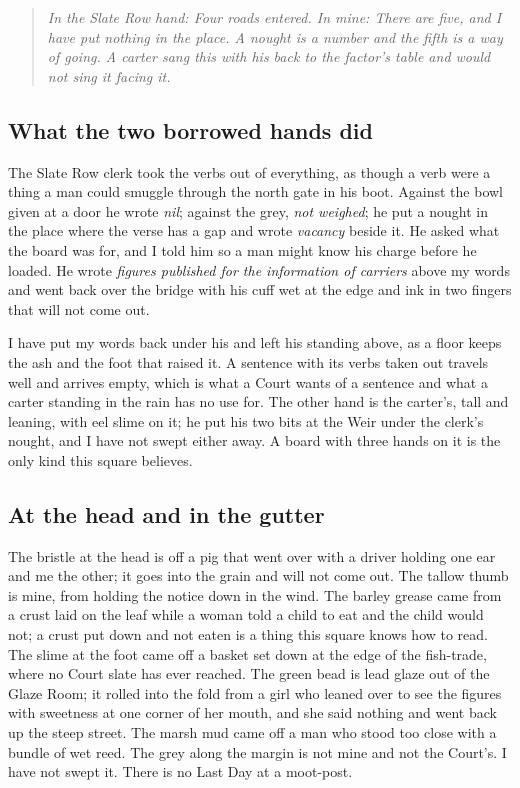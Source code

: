 \documentclass{design/chronicle}
\begin{document}
\begin{quote}\itshape \emph{In the Slate Row hand:} Four roads entered. \emph{In mine:} There are five, and I have put nothing in the place. A nought is a number and the fifth is a way of going. A carter sang this with his back to the factor’s table and would not sing it facing it.\end{quote}

\subsection*{What the two borrowed hands did}

The Slate Row clerk took the verbs out of everything, as though a verb were a thing a man could smuggle through the north gate in his boot. Against the bowl given at a door he wrote \emph{nil}; against the grey, \emph{not weighed}; he put a nought in the place where the verse has a gap and wrote \emph{vacancy} beside it. He asked what the board was for, and I told him so a man might know his charge before he loaded. He wrote \emph{figures published for the information of carriers} above my words and went back over the bridge with his cuff wet at the edge and ink in two fingers that will not come out.

I have put my words back under his and left his standing above, as a floor keeps the ash and the foot that raised it. A sentence with its verbs taken out travels well and arrives empty, which is what a Court wants of a sentence and what a carter standing in the rain has no use for. The other hand is the carter’s, tall and leaning, with eel slime on it; he put his two bits at the Weir under the clerk’s nought, and I have not swept either away. A board with three hands on it is the only kind this square believes.

\subsection*{At the head and in the gutter}

The bristle at the head is off a pig that went over with a driver holding one ear and me the other; it goes into the grain and will not come out. The tallow thumb is mine, from holding the notice down in the wind. The barley grease came from a crust laid on the leaf while a woman told a child to eat and the child would not; a crust put down and not eaten is a thing this square knows how to read. The slime at the foot came off a basket set down at the edge of the fish-trade, where no Court slate has ever reached. The green bead is lead glaze out of the Glaze Room; it rolled into the fold from a girl who leaned over to see the figures with sweetness at one corner of her mouth, and she said nothing and went back up the steep street. The marsh mud came off a man who stood too close with a bundle of wet reed. The grey along the margin is not mine and not the Court’s. I have not swept it. There is no Last Day at a moot-post.
\end{document}
